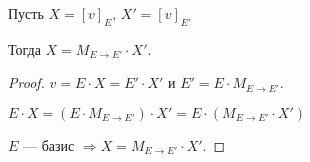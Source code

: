 \begin{theorem-non} 
    
    Пусть $X = [v]_E,\, X' = [v]_{E'}$

    Тогда $X = M_{E \to E'} \cdot X'$.
    \begin{proof}
        
        $v = E \cdot X = E' \cdot X'$ и $E' = E \cdot M_{E \to E'}$.

        $E \cdot X = (E \cdot M_{E \to E'}) \cdot X' = E \cdot (M_{E \to E'} \cdot X')$

        $E$ --- базис $\Longrightarrow X = M_{E \to E'} \cdot X'$.

    \end{proof}
\end{theorem-non}




